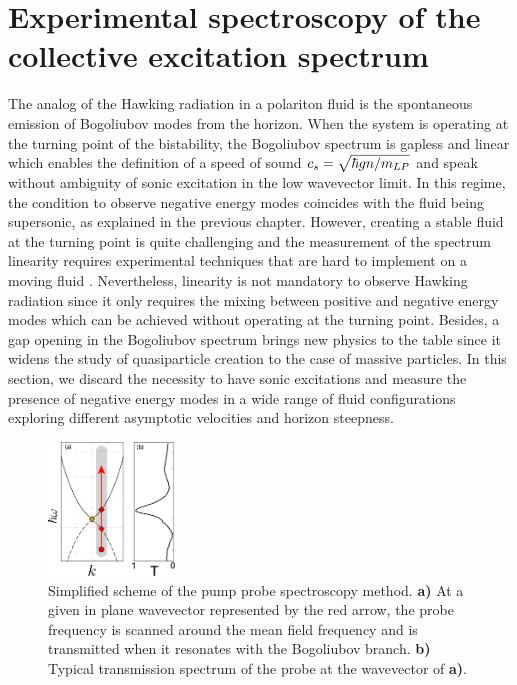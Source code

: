 \section{Experimental spectroscopy of the collective excitation spectrum}

The analog of the Hawking radiation in a polariton fluid is the spontaneous emission of Bogoliubov modes from the horizon. When the system is operating at the turning point of the bistability, the Bogoliubov spectrum 
is gapless and linear which enables the definition of a speed of sound $c_s = \sqrt{\hbar g n /m_{LP}}$ and speak without ambiguity of sonic excitation in the low wavevector limit. In this regime, the condition to observe negative energy modes coincides with the fluid being supersonic, as explained in the previous chapter. 
However, creating a stable fluid at the turning point is quite challenging and the measurement of the spectrum linearity requires experimental techniques that are hard to implement on a moving fluid \cite{claude_phd}. Nevertheless, linearity is not mandatory to observe Hawking radiation since 
it only requires the mixing between positive and negative energy modes which can be achieved without operating at the turning point. Besides, a gap opening in the Bogoliubov spectrum brings new physics to the table since it widens the study of quasiparticle creation to the case of massive particles. In this
section, we discard the necessity to have sonic excitations and measure the presence of negative energy modes in a wide range of fluid configurations exploring different asymptotic velocities and horizon steepness.

\begin{figure}[h]
    \centering
    \includegraphics[width=0.3\textwidth]{chap_custom_st/fig/setup_bogoliubov.pdf}
    \caption{Simplified scheme of the pump probe spectroscopy method. \textbf{a)} At a given in plane wavevector represented by the red arrow, the probe frequency is scanned around the mean field frequency and is transmitted when it resonates with the Bogoliubov branch. \textbf{b)} Typical transmission spectrum of the probe at the wavevector of \textbf{a)}.}
    \label{fig:setup_bogo}
\end{figure}


